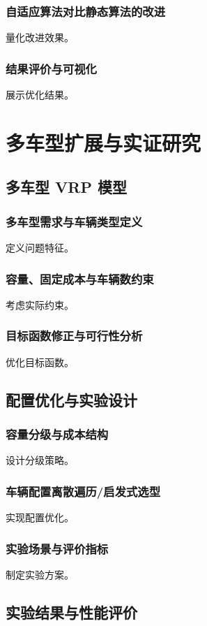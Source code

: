 \documentclass[12pt,a4paper,twoside]{ctexbook}
\begin{document}
\subsection{自适应算法对比静态算法的改进}
量化改进效果。

\subsection{结果评价与可视化}
展示优化结果。

\chapter{多车型扩展与实证研究}
\section{多车型 VRP 模型}
\subsection{多车型需求与车辆类型定义}
定义问题特征。

\subsection{容量、固定成本与车辆数约束}
考虑实际约束。

\subsection{目标函数修正与可行性分析}
优化目标函数。

\section{配置优化与实验设计}
\subsection{容量分级与成本结构}
设计分级策略。

\subsection{车辆配置离散遍历/启发式选型}
实现配置优化。

\subsection{实验场景与评价指标}
制定实验方案。

\section{实验结果与性能评价}
\end{document}
